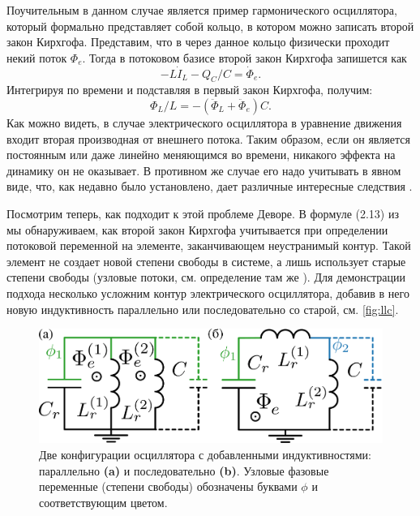 \documentclass[14pt, a4paper]{extreport}
\numberwithin{equation}{section}
\begin{document}
Поучительным в данном случае является пример гармонического осциллятора, который формально представляет собой кольцо, в котором можно записать второй закон Кирхгофа. Представим, что в через данное кольцо физически проходит некий поток $\Phi_e$. Тогда в потоковом базисе второй закон Кирхгофа запишется как
\begin{equation}
	-L\dot I_L - Q_C/C = \dot \Phi_e.
\end{equation}
Интегрируя по времени и подставляя в первый закон Кирхгофа, получим:
\begin{equation}
	\Phi_L/L = - (\ddot \Phi_L + \ddot \Phi_e)C.
\end{equation}
Как можно видеть, в случае электрического осциллятора в уравнение движения входит вторая производная от внешнего потока. Таким образом, если он является постоянным или даже линейно меняющимся во времени, никакого эффекта на динамику он не оказывает. В противном же случае его надо учитывать в явном виде, что, как недавно было установлено, дает различные интересные следствия \cite{you2019circuit,riwar2021circuit}.

Посмотрим теперь, как подходит к этой проблеме Деворе. В формуле (2.13) из \cite{devoret1995quantum} мы обнаруживаем, как второй закон Кирхгофа учитывается при определении потоковой переменной на элементе, заканчивающем неустранимый контур. Такой элемент не создает новой степени свободы в системе, а лишь использует старые степени свободы (узловые потоки, см. определение там же \cite{devoret1995quantum}). Для демонстрации подхода несколько усложним контур электрического осциллятора, добавив в него новую индуктивность параллельно или последовательно со старой, см. \autoref{fig:llc}.
\begin{figure}
	\centering
	\includegraphics[width=0.8\linewidth]{Pictures/LLC}
	\caption{Две конфигурации осциллятора с добавленными индуктивностями: параллельно \textbf{(a)} и последовательно \textbf{(b)}. Узловые фазовые переменные (степени свободы) обозначены буквами $\phi$ и соответствующим цветом.}
	\label{fig:llc}
\end{figure}
\end{document}
